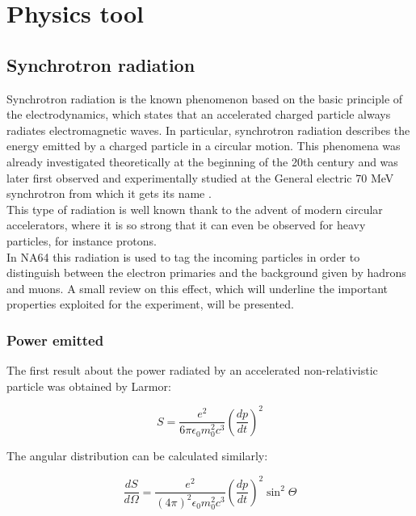 
\newcommand{\appdirb}{appendices/plots/appendixB}

\chapter{Physics tool}

\label{AppendixB}

\section{Synchrotron radiation}
\label{appB:sec:sr}

Synchrotron radiation is the known phenomenon based on the basic principle of the electrodynamics, which states that an accelerated charged particle always radiates electromagnetic waves. In particular, synchrotron radiation describes the energy emitted by a charged particle in a circular motion. This phenomena was already investigated theoretically at the beginning of the 20th century and was later first observed and experimentally studied at the General electric 70 MeV synchrotron from which it gets its name \cite{synchrotron-radiation}. \\
This type of radiation is well known thank to the advent of modern circular accelerators, where it is so strong that it can even be observed for heavy particles, for instance protons. \\
In NA64 this radiation is used to tag the incoming particles in order to distinguish between the electron primaries and the background given by hadrons and muons. A small review on this effect, which will underline the important properties exploited for the experiment, will be presented.


\subsection{Power emitted}
The first result about the power radiated by an accelerated non-relativistic particle was obtained by Larmor:

\begin{equation}
S = \frac{e^2}{6 \pi \epsilon_0 m_0^2 c^3}\left(\frac{dp}{dt}\right)^2
\label{eqn:radiated-power}
\end{equation}

The angular distribution can be calculated similarly:

\begin{equation}
\frac{dS}{d\Omega} = \frac{e^2}{(4 \pi)^2 \epsilon_0 m_0^2 c^3}\left(\frac{dp}{dt}\right)^2\sin^2\Theta
\label{eqn:angular-dist}
\end{equation}

